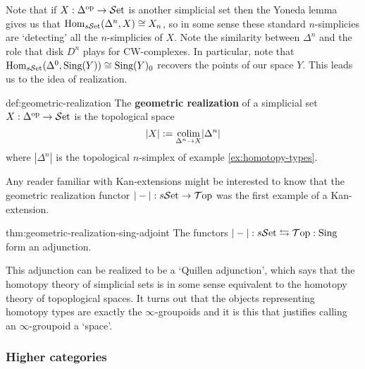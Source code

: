 Note that if $X : \Delta^\text{op} \to {\mathcal{S}\text{et}}$ is another simplicial set then the Yoneda lemma gives us that ${\text{Hom}}_{s{\mathcal{S}\text{et}}}(\Delta^n,X) \cong X_n$, so in some sense these standard $n$-simplicies are `detecting' all the $n$-simplicies of $X$. Note the similarity between $\Delta^n$ and the role that disk $D^n$ plays for CW-complexes. In particular, note that ${\text{Hom}}_{s{\mathcal{S}\text{et}}}(\Delta^0,\text{Sing}(Y)) \cong \text{Sing}(Y)_0$ recovers the points of our space $Y$. This leads us to the idea of realization.

\begin{definition}{def:geometric-realization}
	The \textbf{geometric realization} of a simplicial set $X : \Delta^\text{op} \to {\mathcal{S}\text{et}}$ is the topological space 
		\[
		|X|
		:= \underset{\Delta^n \to X}{{\text{colim}}} |\Delta^n|
		\]
where $|\Delta^n|$ is the topological $n$-simplex of example \ref{ex:homotopy-types}.
\end{definition}

Any reader familiar with Kan-extensions might be interested to know that the geometric realization functor $|-| : s{\mathcal{S}\text{et}} \to {\mathcal{T}\text{op}}$ was the first example of a Kan-extension.

\begin{theorem}{thm:geometric-realization-sing-adjoint}
	The functors $|-| : s{\mathcal{S}\text{et}} \leftrightarrows {\mathcal{T}\text{op}} : \text{Sing}$ form an adjunction. 
\end{theorem}

This adjunction can be realized to be a `Quillen adjunction', which says that the homotopy theory of simplicial sets is in some sense equivalent to the homotopy theory of topoplogical spaces. It turns out that the objects representing homotopy types are exactly the $\infty$-groupoids and it is this that justifies calling an $\infty$-groupoid a `space'.




\newpage
\subsubsection{Higher categories}

